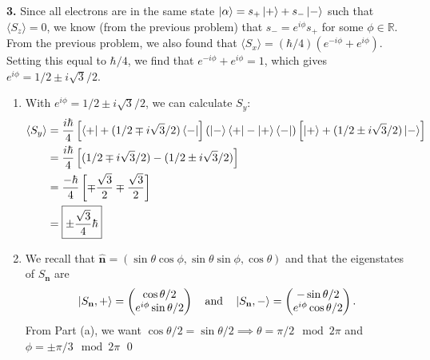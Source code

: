 \documentclass{article}
\theoremstyle{definition}
\newcommand{\al}{\alpha}
\newcommand{\f}[2]{\frac{#1}{#2}}
\newcommand{\lp}{\left(}
\newcommand{\rp}{\right)}
\newcommand{\lb}{\left[}
\newcommand{\rb}{\right]}
\begin{document}
\newpage








\noindent \textbf{3.} Since all electrons are in the same state $\ket{\al} = s_+ \ket{+} + s_-\ket{-}$ such that $\langle S_z \rangle = 0$, we know (from the previous problem) that $s_- = e^{i\phi} s_+$ for some $\phi \in \mathbb{R}$. From the previous problem, we also found that $\langle S_x \rangle = (\hbar/4)\lp e^{-i\phi} + e^{i\phi}  \rp$. Setting this equal to $\hbar/4$, we find that $e^{-i\phi} + e^{i\phi}  = 1$, which gives $e^{i\phi} = 1/2\pm i\sqrt{3}/2$.

\begin{enumerate}[label=(\alph*)]
	\item With $e^{i\phi} = 1/2 \pm i\sqrt{3}/2$, we can calculate $S_y$:
	\begin{align*}
	\langle S_y \rangle 
	&= \f{i\hbar}{4}\lb \bra{+} + (1/2\mp i\sqrt{3}/2) \bra{-} \rb 
	\lp \ket{-}\bra{+} - \ket{+}\bra{-}\rp 
	\lb \ket{+} + (1/2\pm i\sqrt{3}/2) \ket{-} \rb\\
	&= \f{i\hbar}{4}\lb (1/2\mp i\sqrt{3}/2) - (1/2\pm i\sqrt{3}/2) \rb\\
	&= \f{-\hbar}{4}\lb \mp \f{\sqrt{3}}{2} \mp \f{\sqrt{3}}{2} \rb \\
	&= \boxed{\pm\f{\sqrt{3}}{4}\hbar}
	\end{align*}
	
	
	
	
	\item We recall that $\widehat{\mathbf{n}} = (\sin\theta\cos\phi, \sin\theta\sin\phi,\cos\theta)$ and that the eigenstates of $S_\mathbf{n}$ are 
	\begin{equation*}
	\ket{S_\mathbf{n}, +} = \begin{pmatrix}
	\cos\theta/2 \\ e^{i\phi}\sin\theta/2
	\end{pmatrix} \quad \text{and} \quad 
	\ket{S_\mathbf{n}, -} = \begin{pmatrix}
	-\sin\theta/2 \\ e^{i\phi}\cos\theta/2
	\end{pmatrix}.
	\end{equation*}
	From Part (a), we want $\cos\theta/2 = \sin\theta/2 \implies \boxed{\theta = \pi/2 \mod 2\pi}$ and $\boxed{\phi = \pm \pi/3 \mod 2\pi}$ \qed
\end{enumerate}
	
	
	
\newpage
\end{document}

